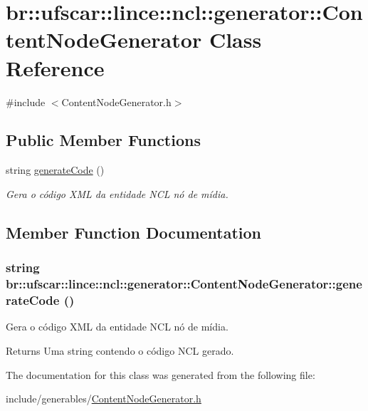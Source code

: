 \hypertarget{classbr_1_1ufscar_1_1lince_1_1ncl_1_1generator_1_1ContentNodeGenerator}{
\section{br::ufscar::lince::ncl::generator::ContentNodeGenerator Class Reference}
\label{classbr_1_1ufscar_1_1lince_1_1ncl_1_1generator_1_1ContentNodeGenerator}
}


{\ttfamily \#include $<$ContentNodeGenerator.h$>$}

\subsection*{Public Member Functions}
\begin{DoxyCompactItemize}
\item 
string \hyperlink{classbr_1_1ufscar_1_1lince_1_1ncl_1_1generator_1_1ContentNodeGenerator_a05659cc5e42f390a42f1a1399c53b178}{generateCode} ()
\begin{DoxyCompactList}\small\item\em Gera o código XML da entidade NCL nó de mídia. \item\end{DoxyCompactList}\end{DoxyCompactItemize}


\subsection{Member Function Documentation}
\hypertarget{classbr_1_1ufscar_1_1lince_1_1ncl_1_1generator_1_1ContentNodeGenerator_a05659cc5e42f390a42f1a1399c53b178}{
\subsubsection[{generateCode}]{\setlength{\rightskip}{0pt plus 5cm}string br::ufscar::lince::ncl::generator::ContentNodeGenerator::generateCode ()}}
\label{classbr_1_1ufscar_1_1lince_1_1ncl_1_1generator_1_1ContentNodeGenerator_a05659cc5e42f390a42f1a1399c53b178}


Gera o código XML da entidade NCL nó de mídia. 

\begin{DoxyReturn}{Returns}
Uma string contendo o código NCL gerado. 
\end{DoxyReturn}


The documentation for this class was generated from the following file:\begin{DoxyCompactItemize}
\item 
include/generables/\hyperlink{ContentNodeGenerator_8h}{ContentNodeGenerator.h}\end{DoxyCompactItemize}
